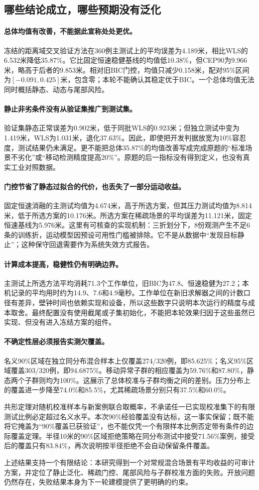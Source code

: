 \subsection{哪些结论成立，哪些预期没有泛化}

\paragraph{总体均值有改善，不能据此宣称处处更优。}
冻结的距离域交叉验证方法在360例主测试上的平均误差为4.189米，相比WLS的6.532米降低35.87\%。它比固定恒速稳健基线的均值低10.38\%，但CEP90为9.966米，略高于后者的9.853米。相对旧BIC门控，均值只减少0.158米，配对95\%区间为$[-0.091,0.425]$米，包含零；本轮不能确认其稳定优于BIC。一个总体均值无法同时概括静态、动态与尾部风险。

\paragraph{静止非劣条件没有从验证集推广到测试集。}
验证集静态正常误差为0.902米，低于同批WLS的0.923米；但独立测试中变为1.419米，WLS为1.031米，退化37.63\%。因此，即使把开发判据放宽为10\%容忍度，测试结果仍未满足。更不能把总体35.87\%的均值改善写成完成原题的“标准场景不劣化”或“移动检测精度提高20\%”。原题的后一指标没有得到定义，也没有真实工业对照数据。

\paragraph{门控节省了静态过拟合的代价，也丢失了一部分运动收益。}
固定恒速消融的主测试均值为4.674米，高于所选方案，但其压力测试均值为8.814米，低于所选方案的10.176米。所选方案在稀疏场景的平均误差为11.121米，固定恒速基线为5.976米。这里有可核查的实现机制：三折划分下，8份观测产生不足6条的训练折，运动模型因预设可用性门槛被排除。它不是从数据中“发现目标静止”；这种保守回退需要作为系统失效方式报告。

\paragraph{计算成本提高，稳健性仍有明确边界。}
主测试上所选方法平均消耗71.3个工作单位，旧BIC为47.8、恒速稳健为27.2；本机记录的平均用时约为14.9、7.6和4.9毫秒。工作单位在新旧求解器之间的计数口径有差异，壁钟时间也依赖实现和设备，所以这些数字只说明本次运行的精度与成本取舍。最终配置没有使用截尾或子集初始化，不能把本轮效果归因于这些虽然已实现、但没有进入冻结方案的组件。

\paragraph{不确定性层必须报告实测欠覆盖。}
名义90\%区域在独立同分布混合样本上仅覆盖274/320例，即85.625\%；名义95\%区域覆盖303/320例，即94.6875\%。移动异常子群的相应覆盖为59.76\%和87.80\%，静态两个子群则均为100\%。这展示了总体校准与子群均衡之间的差别。压力分布上的覆盖进一步降至74.0\%和85.5\%，尤其稀疏场景分别只有37.5\%和60.0\%。

共形定理对随机校准样本与新案例联合取概率，不承诺任一已实现校准集下的有限测试比例必定超过名义水平。本次90\%经验覆盖没有达标，这一事实保留；既不能将它掩盖为“90\%覆盖已获验证”，也不能仅凭一个有限样本比例否定带有条件的边际覆盖定理。半径10米的90\%区域拒绝策略在同分布测试中接受71.56\%案例，接受后的覆盖只有83.84\%，再次说明按半径拒绝不会自动保留条件覆盖。

上述结果支持一个有限结论：本研究得到一个对常规混合场景有平均收益的可审计方案，并定位了静止泛化、稀疏门控、尾部风险与子群校准方面的失败。开放问题仍然存在，失败结果本身为下一轮建模提供了更明确的约束。
